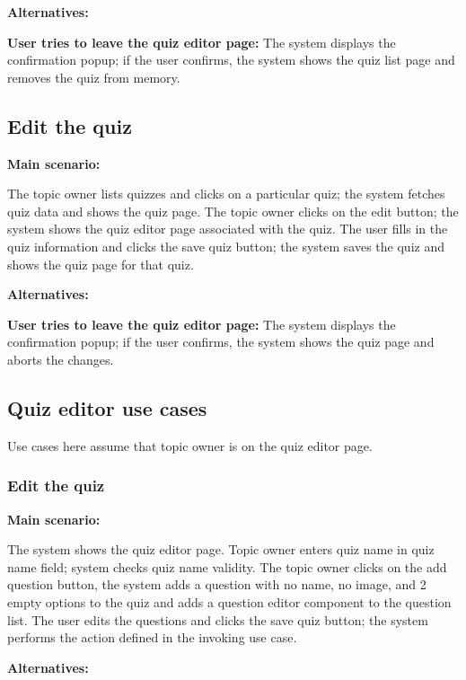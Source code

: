 \documentclass[
    english, %
]{VUMIFPSkursinis}
\begin{document}
\noindent\textbf{\fontsize{13}{15}\selectfont Alternatives:}

\textbf{User tries to leave the quiz editor page:} The system displays the confirmation popup; if the user confirms, the system shows the quiz list page and removes the quiz from memory.

\subsection{Edit the quiz}

\noindent\textbf{\fontsize{13}{15}\selectfont Main scenario:}

The topic owner lists quizzes and clicks on a particular quiz; the system fetches quiz data and shows the quiz page. The topic owner clicks on the edit button; the system shows the quiz editor page associated with the quiz. The user fills in the quiz information and clicks the save quiz button; the system saves the quiz and shows the quiz page for that quiz.

\noindent\textbf{\fontsize{13}{15}\selectfont Alternatives:}

\textbf{User tries to leave the quiz editor page:} The system displays the confirmation popup; if the user confirms, the system shows the quiz page and aborts the changes.

\subsection{Quiz editor use cases}

Use cases here assume that topic owner is on the quiz editor page.

\subsubsection{Edit the quiz}

\noindent\textbf{\fontsize{13}{15}\selectfont Main scenario:}

The system shows the quiz editor page. Topic owner enters quiz name in quiz name field; system checks quiz name validity. The topic owner clicks on the add question button, the system adds a question with no name, no image, and 2 empty options to the quiz and adds a question editor component to the question list. The user edits the questions and clicks the save quiz button; the system performs the action defined in the invoking use case.

\noindent\textbf{\fontsize{13}{15}\selectfont Alternatives:}
\end{document}
